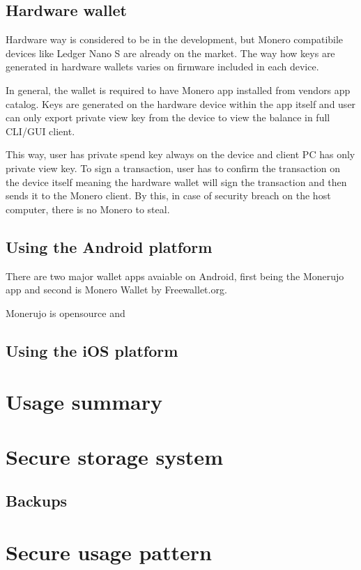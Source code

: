 \documentclass[
  printed, %
  table,   %
  nolof,     %
  nolot,     %
           oneside, color
]{fithesis3}
\begin{document}
\subsection{Hardware wallet}

Hardware way is considered to be in the development, but Monero compatibile devices like Ledger Nano S are already on the market. The way how keys are generated in hardware wallets varies on firmware included in each device. 

In general, the wallet is required to have Monero app installed from vendors app catalog. Keys are generated on the hardware device within the app itself and user can only export private view key from the device to view the balance in full CLI/GUI client.

This way, user has private spend key always on the device and client PC has only private view key. To sign a transaction, user has to confirm the transaction on the device itself meaning the hardware wallet will sign the transaction and then sends it to the Monero client. By this, in case of security breach on the host computer, there is no Monero to steal.


\subsection{Using the Android platform}
There are two major wallet apps avaiable on Android, first being the Monerujo app and second is Monero Wallet by Freewallet.org. 

Monerujo is opensource and 
\subsection{Using the iOS platform}

\section{Usage summary}

\section{Secure storage system}
\subsection{Backups}

\section{Secure usage pattern}
\end{document}
